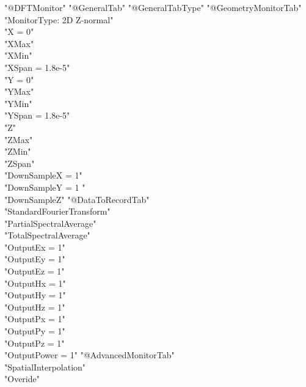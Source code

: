 \documentclass[12pt]{article}
\numberwithin{equation}{section}
\numberwithin{equation}{section}
\begin{document}
\begin{outline}[enumerate]
       \2 "@DFTMonitor"  
         \3 "@GeneralTab" %
         \3 "@GeneralTabType" %
         \3 "@GeometryMonitorTab" \\%
         "MonitorType: 2D Z-normal" \\"X = 0" \\"XMax" \\"XMin" \\"XSpan = 1.8e-5" \\"Y = 0" \\"YMax" \\"YMin" \\"YSpan = 1.8e-5" \\"Z" \\"ZMax" \\"ZMin" \\"ZSpan" \\ "DownSampleX = 1" \\ "DownSampleY = 1 " \\ "DownSampleZ"  
         \3 "@DataToRecordTab" \\
         "StandardFourierTransform" \\ "PartialSpectralAverage" \\ "TotalSpectralAverage" \\ "OutputEx = 1" \\"OutputEy = 1" \\ "OutputEz = 1" \\"OutputHx = 1" \\ "OutputHy = 1" \\ "OutputHz = 1" \\ "OutputPx = 1" \\ "OutputPy = 1" \\ "OutputPz = 1" \\ "OutputPower = 1"
         \3 "@AdvancedMonitorTab" \\
         "SpatialInterpolation" \\ "Overide" 
         

\end{outline}
\end{document}
